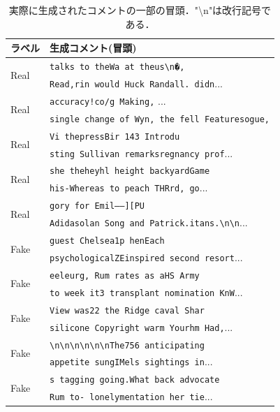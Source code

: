 \begin{table}[h]
    \caption{実際に生成されたコメントの一部の冒頭．"\textbackslash n"は改行記号である．}
    \label{tbl:generated_comments}
    \centering
    \begin{tabular}{ll}
        \hline
        ラベル & 生成コメント(冒頭) \\ \hline
        \multirow{2}{*}{Real} & \texttt{talks to theWa at theus\textbackslash n�,}\\
        & \texttt{Read,rin would Huck Randall. didn}...\\\hline
        \multirow{2}{*}{Real} & \texttt{accuracy!co/g Making,} ...\\
        & \texttt{single change of Wyn, the fell Featuresogue,}\\\hline
        \multirow{2}{*}{Real} & \texttt{Vi thepressBir 143 Introdu}\\
        & \texttt{sting Sullivan remarksregnancy prof}...\\\hline
        \multirow{2}{*}{Real} & \texttt{she theheyhl height backyardGame}\\
        & \texttt{his-Whereas to peach THRrd, go}...\\\hline
        \multirow{2}{*}{Real} & \texttt{gory for Emil-----][PU}\\ & \texttt{Adidasolan Song and Patrick.itans.\textbackslash n\textbackslash n}...\\ \hline\hline
        \multirow{2}{*}{Fake} & \texttt{guest Chelsea1p henEach}\\
        & \texttt{psychologicalZEinspired second resort}...\\\hline
        \multirow{2}{*}{Fake} & \texttt{eeleurg, Rum rates as aHS Army}\\
        & \texttt{to week it3 transplant nomination KnW}... \\\hline
        \multirow{2}{*}{Fake} & \texttt{View was22 the Ridge caval Shar}\\
        & \texttt{silicone Copyright warm Yourhm Had,}...\\\hline
        \multirow{2}{*}{Fake} & \texttt{\textbackslash n\textbackslash n\textbackslash n\textbackslash n\textbackslash n\textbackslash nThe756 anticipating}\\
        & \texttt{appetite sungIMels sightings in}...\\\hline
        \multirow{2}{*}{Fake} & \texttt{s tagging going.What back advocate}\\
        & \texttt{Rum to- lonelymentation her tie}...\\ \hline
    \end{tabular}
\end{table}

